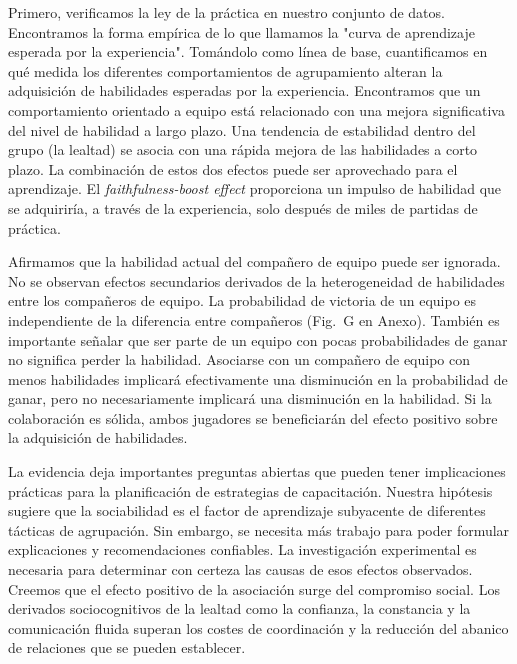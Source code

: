 \documentclass[a4paper,10pt]{book}
\theoremstyle{definition}
\begin{document}
Primero, verificamos la ley de la práctica en nuestro conjunto de datos.
%
Encontramos la forma emp\'irica de lo que llamamos la "curva de aprendizaje esperada por la experiencia".
%
Tomándolo como l\'inea de base, cuantificamos en qué medida los diferentes comportamientos de agrupamiento alteran la adquisici\'on de habilidades esperadas por la experiencia.
%
Encontramos que un comportamiento orientado a equipo está relacionado con una mejora significativa del nivel de habilidad a largo plazo.
%
Una tendencia de estabilidad dentro del grupo (la lealtad) se asocia con una rápida mejora de las habilidades a corto plazo.
%
La combinaci\'on de estos dos efectos puede ser aprovechado para el aprendizaje.
%
El \emph{faithfulness-boost effect} proporciona un impulso de habilidad que se adquirir\'ia, a través de la experiencia, solo después de miles de partidas de práctica.


Afirmamos que la habilidad actual del compañero de equipo puede ser ignorada.
%
No se observan efectos secundarios derivados de la heterogeneidad de habilidades entre los compañeros de equipo.
%
La probabilidad de victoria de un equipo es independiente de la diferencia entre compañeros (Fig.~G en Anexo).
%
También es importante señalar que ser parte de un equipo con pocas probabilidades de ganar no significa perder la habilidad.
%
Asociarse con un compañero de equipo con menos habilidades implicará efectivamente una disminuci\'on en la probabilidad de ganar, pero no necesariamente implicará una disminuci\'on en la habilidad.
%
Si la colaboraci\'on es s\'olida, ambos jugadores se beneficiarán del efecto positivo sobre la adquisici\'on de habilidades.


La evidencia deja importantes preguntas abiertas que pueden tener implicaciones prácticas para la planificaci\'on de estrategias de capacitaci\'on.
%
Nuestra hip\'otesis sugiere que la sociabilidad es el factor de aprendizaje subyacente de diferentes tácticas de agrupaci\'on.
%
Sin embargo, se necesita más trabajo para poder formular explicaciones y recomendaciones confiables.
%
La investigaci\'on experimental es necesaria para determinar con certeza las causas de esos efectos observados.
%
Creemos que el efecto positivo de la asociaci\'on surge del compromiso social.
%
Los derivados sociocognitivos de la lealtad como la confianza, la constancia y la comunicaci\'on fluida superan los costes de coordinaci\'on y la reducci\'on del abanico de relaciones que se pueden establecer.
\end{document}
